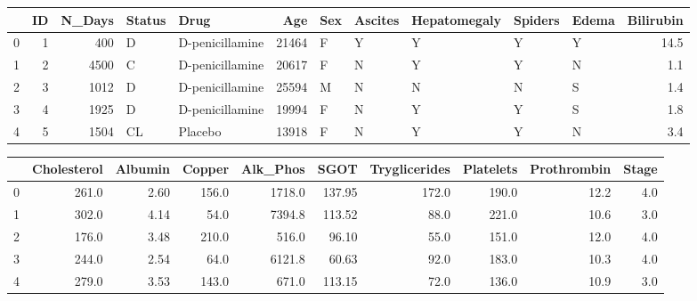 \begin{tabular}{lrrllrlllllr}
\toprule
{} &  ID &  N\_Days & Status &             Drug &    Age & Sex & Ascites & Hepatomegaly & Spiders & Edema &  Bilirubin \\
\midrule
0 &   1 &     400 &      D &  D-penicillamine &  21464 &   F &       Y &            Y &       Y &     Y &       14.5 \\
1 &   2 &    4500 &      C &  D-penicillamine &  20617 &   F &       N &            Y &       Y &     N &        1.1 \\
2 &   3 &    1012 &      D &  D-penicillamine &  25594 &   M &       N &            N &       N &     S &        1.4 \\
3 &   4 &    1925 &      D &  D-penicillamine &  19994 &   F &       N &            Y &       Y &     S &        1.8 \\
4 &   5 &    1504 &     CL &          Placebo &  13918 &   F &       N &            Y &       Y &     N &        3.4 \\
\bottomrule
\end{tabular}
\begin{tabular}{lrrrrrrrrr}
\toprule
{} &  Cholesterol &  Albumin &  Copper &  Alk\_Phos &    SGOT &  Tryglicerides &  Platelets &  Prothrombin &  Stage \\
\midrule
0 &        261.0 &     2.60 &   156.0 &    1718.0 &  137.95 &          172.0 &      190.0 &         12.2 &    4.0 \\
1 &        302.0 &     4.14 &    54.0 &    7394.8 &  113.52 &           88.0 &      221.0 &         10.6 &    3.0 \\
2 &        176.0 &     3.48 &   210.0 &     516.0 &   96.10 &           55.0 &      151.0 &         12.0 &    4.0 \\
3 &        244.0 &     2.54 &    64.0 &    6121.8 &   60.63 &           92.0 &      183.0 &         10.3 &    4.0 \\
4 &        279.0 &     3.53 &   143.0 &     671.0 &  113.15 &           72.0 &      136.0 &         10.9 &    3.0 \\
\bottomrule
\end{tabular}
